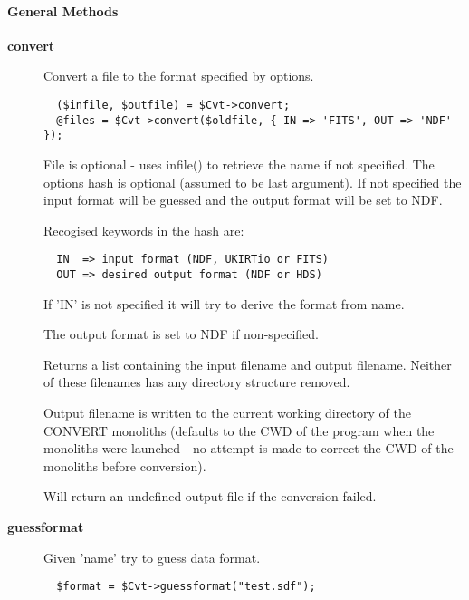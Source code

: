 \paragraph*{General Methods\label{ORAC::Convert_General_Methods}}
\begin{description}

\item[{\textbf{convert}}] \mbox{}

Convert a file to the format specified by options.

\begin{verbatim}
  ($infile, $outfile) = $Cvt->convert;
  @files = $Cvt->convert($oldfile, { IN => 'FITS', OUT => 'NDF' });
\end{verbatim}


File is optional - uses infile() to retrieve the name if not specified.
The options hash is optional (assumed to be last argument). If not
specified the input format will be guessed and the output format
will be set to NDF.



Recogised keywords in the hash are:

\begin{verbatim}
  IN  => input format (NDF, UKIRTio or FITS)
  OUT => desired output format (NDF or HDS)
\end{verbatim}


If 'IN' is not specified it will try to derive the format from
name.



The output format is set to NDF if non-specified.



Returns a list containing the input filename and output filename.
Neither of these filenames has any directory structure removed.



Output filename is written to the current working directory of the
CONVERT monoliths (defaults to the CWD of the program when the
monoliths were launched - no attempt is made to correct the
CWD of the monoliths before conversion).



Will return an undefined output file if the conversion failed.


\item[{\textbf{guessformat}}] \mbox{}

Given 'name' try to guess data format.

\begin{verbatim}
  $format = $Cvt->guessformat("test.sdf");
\end{verbatim}



\end{description}

